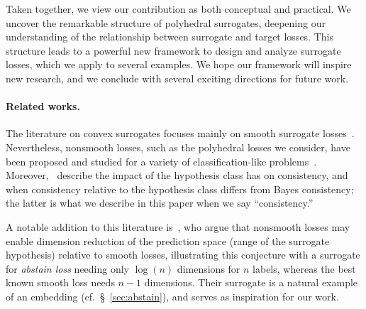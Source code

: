 \documentclass[11pt]{article}
\newcommand{\Comments}{1}
\newcommand{\mynote}[2]{\ifnum\Comments=1\textcolor{#1}{#2}\fi}
\newcommand{\jessie}[1]{\mynote{teal}{[JF: #1]}}
\begin{document}
Taken together, we view our contribution as both conceptual and practical.
We uncover the remarkable structure of polyhedral surrogates, deepening our understanding of the relationship between surrogate and target losses.
This structure leads to a powerful new framework to design and analyze surrogate losses, which we apply to several examples.
We hope our framework will inspire new research, and we conclude with several exciting directions for future work.


\paragraph{Related works.}
The literature on convex surrogates focuses mainly on smooth surrogate losses~\citep{crammer2001algorithmic,bartlett2006convexity,bartlett2008classification, duchi2018multiclass, williamson2016composite, reid2010composite,menon2019multilabel,zhang2020convex,bao2020calibrated}.
Nevertheless, nonsmooth losses, such as the polyhedral losses we consider, have been proposed and studied for a variety of classification-like problems~\citep{yang2018consistency,yu2018lovasz,lapin2015top}.
Moreover,~\citet{zhang2020bayes} describe the impact of the hypothesis class has on consistency, and when consistency relative to the hypothesis class differs from Bayes consistency; the latter is what we describe in this paper when we say ``consistency.''

A notable addition to this literature is~\citet{ramaswamy2018consistent}, who argue that nonsmooth losses may enable dimension reduction of the prediction space (range of the surrogate hypothesis) relative to smooth losses, illustrating this conjecture with a surrogate for \emph{abstain loss} needing only $\log(n)$ dimensions for $n$ labels, whereas the best known smooth loss needs $n-1$ dimensions.
Their surrogate is a natural example of an embedding (cf.~\S~\ref{sec:abstain}), and serves as inspiration for our work.
\end{document}
